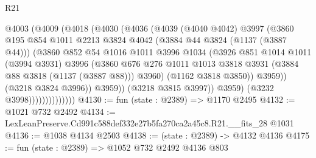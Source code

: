 \begin{lexlean}{R21}
\begin{coremodule}
                            @4003
                              (@4009
                                (@4018
                                  (@4030
                                    (@4036
                                      (@4039
                                        (@4040 @4042)
                                        @3997
                                        (@3860
                                          @195
                                          @854
                                          @1011
                                          @2213
                                          @3824
                                          @4042
                                          (@3884 @44 @3824 (@1137 (@3887 @44)))
                                          (@3860
                                            @852
                                            @54
                                            @1016
                                            @1011
                                            @3996
                                            @1034
                                            (@3926
                                              @851
                                              @1014
                                              @1011
                                              (@3994 @3931)
                                              @3996
                                              (@3860
                                                @676
                                                @276
                                                @1011
                                                @1013
                                                @3818
                                                @3931
                                                (@3884 @88 @3818 (@1137 (@3887 @88)))
                                                @3960)
                                              (@1162 @3818 @3850))
                                            @3959))
                                        (@3218 @3824 @3996))
                                      @3959))
                                  (@3218 @3815 @3997))
                                @3959)
                              (@3232 @3998))))))))))))))
@4130 := fun (state : @2389) => @1170 @2495
@4132 := @1021 @732 @2492
@4134 := LexLeanPreserve.Cd991c588def332e27b5fa270ca2a45c8.R21.__fits_28 @1031
@4136 := @1038 @4134 @2503
@4138 := (state : @2389) -> @4132 @4136
@4175 := fun (state : @2389) =>
  @1052
    @732
    @2492
    @4136
    @803

\end{coremodule}
\end{lexlean}
